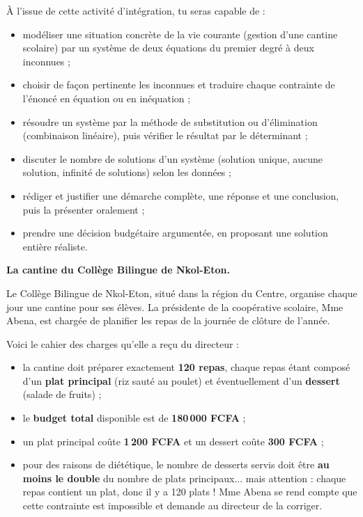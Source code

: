 \documentclass[11pt]{article}
\newcommand{\cle}[1]{{\popxbold\color{popdark}#1}}
\newcounter{popsec}
\newcounter{popsub}
\newcommand{\courssub}[1]{%
  \stepcounter{popsub}%
  \par\vspace{9pt}\noindent{\popxbold\fontsize{11.5}{13}\selectfont\color{popink}{\color{poporange}\thepopsec.\thepopsub}\hspace{6pt}#1}\par\nopagebreak\vspace{4pt}
}
\begin{document}
À l'issue de cette activité d'intégration, tu seras capable de :
\begin{itemize}
\item \cle{modéliser} une situation concrète de la vie courante (gestion d'une cantine scolaire) par un système de deux équations du premier degré à deux inconnues ;
\item choisir de façon pertinente les \cle{inconnues} et traduire chaque contrainte de l'énoncé en équation ou en inéquation ;
\item résoudre un système par la méthode de \cle{substitution} ou d'\cle{élimination} (combinaison linéaire), puis vérifier le résultat par le \cle{déterminant} ;
\item discuter le \cle{nombre de solutions} d'un système (solution unique, aucune solution, infinité de solutions) selon les données ;
\item \cle{rédiger et justifier} une démarche complète, une réponse et une conclusion, puis la présenter oralement ;
\item prendre une \cle{décision budgétaire} argumentée, en proposant une solution entière réaliste.
\end{itemize}

\courssub{Situation}

\textbf{La cantine du Collège Bilingue de Nkol-Eton.}\par
Le Collège Bilingue de Nkol-Eton, situé dans la région du Centre, organise chaque jour une cantine pour ses élèves. La présidente de la coopérative scolaire, Mme Abena, est chargée de planifier les repas de la journée de clôture de l'année.

Voici le cahier des charges qu'elle a reçu du directeur :
\begin{itemize}
\item la cantine doit préparer exactement \textbf{120 repas}, chaque repas étant composé d'un \textbf{plat principal} (riz sauté au poulet) et éventuellement d'un \textbf{dessert} (salade de fruits) ;
\item le \textbf{budget total} disponible est de \textbf{180\,000 FCFA} ;
\item un plat principal coûte \textbf{1\,200 FCFA} et un dessert coûte \textbf{300 FCFA} ;
\item pour des raisons de diététique, le nombre de desserts servis doit être \textbf{au moins le double} du nombre de plats principaux... mais attention : chaque repas contient un plat, donc il y a 120 plats ! Mme Abena se rend compte que cette contrainte est impossible et demande au directeur de la corriger.
\end{itemize}
\end{document}
